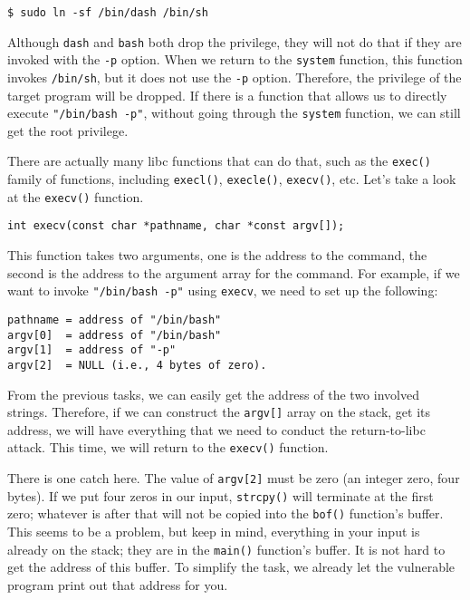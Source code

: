 \begin{lstlisting}
$ sudo ln -sf /bin/dash /bin/sh
\end{lstlisting}

Although \texttt{dash} and \texttt{bash} both drop the \setuid privilege,
they will not do that if they are invoked with the \texttt{-p} option. When
we return to the \texttt{system} function, this function invokes \texttt{/bin/sh}, 
but it does not use the \texttt{-p} option. Therefore, the \setuid
privilege of the target program will be dropped. If there is a function
that allows us to directly execute \texttt{"/bin/bash -p"}, without going
through the \texttt{system} function, we can still get the root privilege. 

There are actually many libc functions that can do that, such as 
the \texttt{exec()} family  of functions, including \texttt{execl()},
\texttt{execle()}, \texttt{execv()}, etc. Let's take a look at the
\texttt{execv()} function.

\begin{lstlisting}
int execv(const char *pathname, char *const argv[]);
\end{lstlisting}
 
This function takes two arguments, one is the address to the command, the 
second is the address to the argument array for the command. For example, if we 
want to invoke \texttt{"/bin/bash -p"} using \texttt{execv}, we need to 
set up the following:

\begin{lstlisting}
pathname = address of "/bin/bash" 
argv[0]  = address of "/bin/bash"
argv[1]  = address of "-p"
argv[2]  = NULL (i.e., 4 bytes of zero).
\end{lstlisting}
 
From the previous tasks, we can easily get the address of the two involved 
strings. Therefore, if we can construct the \texttt{argv[]} array on the stack, 
get its address, we will have everything that we need to conduct the 
return-to-libc attack. This time, we will return to the \texttt{execv()} function. 

There is one catch here. The value of \texttt{argv[2]} must be zero (an integer zero, 
four bytes). If we put four zeros in our input, \texttt{strcpy()} will terminate
at the first zero; whatever is after that will not be copied into 
the \texttt{bof()} function's buffer. This seems to be a problem, but keep
in mind, everything in your input is already on the stack; they are in
the \texttt{main()} function's buffer. It is not hard to get the 
address of this buffer. To simplify the task, we already let the 
vulnerable program print out that address for you. 

